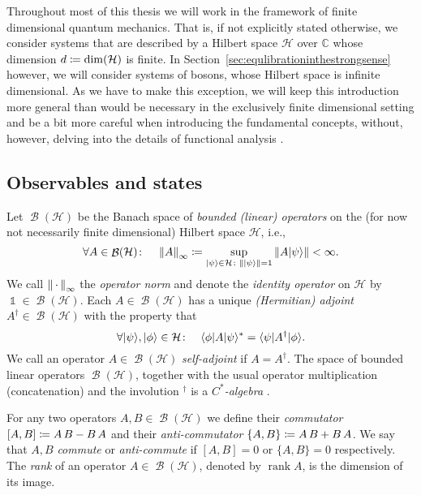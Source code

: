 \documentclass[a4paper,12pt,listof=totoc,index=totoc,bibliography=totoc,headsepline=false,headings=normal,BCOR16.153846mm,DIV12,headinclude,twoside,cleardoublepage=empty,numbers=noenddot,final]{scrreprt}
\theoremstyle{mystyle}
\numberwithin{equation}{section}
\numberwithin{figure}{section}
\numberwithin{lemma}{section}
\numberwithin{theorem}{section}
\numberwithin{corollary}{section}
\numberwithin{definition}{section}
\numberwithin{conjecture}{section}
\numberwithin{observation}{section}
\newcommand{\+}{\mkern2mu}
\newcommand{\coloneqq}{\mathrel{\vcentcolon\mkern-1.2mu=}} %
\newcommand{\argdot}{{\,\cdot\,}}
\newcommand{\suchthat}{\colon}
\newcommand{\itholds}{\colon\mathchoice{\quad}{}{}{}}
\newcommand{\bra}[1]{\langle #1|}
\newcommand{\ket}[1]{|#1\rangle}
\newcommand{\norm}[2][]{
  \ifthenelse{\equal{#1}{}}
    {\left\| {#2} \right\|}
    {\ifthenelse{\equal{#1}{uinv}}
      {\left\vert\kern-0.25ex\left\vert\kern-0.25ex\left\vert {#2} \right\vert\kern-0.25ex\right\vert\kern-0.25ex\right\vert}
      {\left\| {#2} \right\|_{#1}}
    }
}
\newcommand{\ad}{^\dagger}
\DeclareMathOperator{\1}{\mathds{1}}
\DeclareMathOperator{\Bop}{\mathcal{B}}
\DeclareMathOperator{\rank}{rank}
\newcommand{\mc}[1]{\mathcal{#1}}
\newcommand{\mcH}{\mc{H}}
\newcommand{\mb}[1]{\mathbb{#1}}
\renewcommand{\C}{\mb{C}} %
\begin{document}
Throughout most of this thesis we will work in the framework of finite dimensional quantum mechanics.
That is, if not explicitly stated otherwise, we consider systems that are described by a Hilbert space $\mcH$ over $\C$ whose dimension $d\coloneqq\dim(\mcH)$ is finite.
In Section~\ref{sec:equlibrationinthestrongsense} however, we will consider systems of bosons, whose Hilbert space is infinite dimensional.
As we have to make this exception, we will keep this introduction more general than would be necessary in the exclusively finite dimensional setting and be a bit more careful when introducing the fundamental concepts, without, however, delving into the details of functional analysis \cite{Reed1980,Reed1975,BratteliRobinson1,BratteliRobinson2}.


\subsection{Observables and states}
\label{sec:observablesandstates}
%
Let $\Bop(\mcH)$ be the Banach space of \emph{bounded (linear) operators} on the (for now not necessarily finite dimensional) Hilbert space $\mcH$, i.e.,
\begin{equation} \label{eq:operatornorm}
  \forall A \in \Bop(\mcH) \itholds \norm[\infty]A \coloneqq \sup_{\ket\psi\in\mcH\suchthat\norm{\ket\psi}=1} \norm{A \ket\psi} < \infty.
\end{equation}
We call $\norm[\infty]\argdot$ the \emph{operator norm} and denote the \emph{identity operator} on $\mcH$ by $\1 \in \Bop(\mcH)$.
Each $A \in \Bop(\mcH)$ has a unique \emph{(Hermitian) adjoint} $A\ad \in \Bop(\mcH)$ with the property that
\begin{equation} \label{eq:defadjoint}
  \forall \ket\psi,\ket\phi\in\mcH\itholds \bra\phi A \ket\psi^* = \bra\psi A\ad \ket\phi.
\end{equation}
We call an operator $A\in \Bop(\mcH)$ \emph{self-adjoint} if $A = A\ad$.
The space of bounded linear operators $\Bop(\mcH)$, together with the usual operator multiplication (concatenation) and the involution $\ad$ is a \emph{$C^*$-algebra} \cite{Arveson76}.

For any two operators $A,B \in \Bop(\mcH)$ we define their \emph{commutator} $[A,B] \coloneqq A\,B - B\,A$ and their \emph{anti-commutator} $\{A,B\} \coloneqq A\,B + B\,A$.
We say that $A,B$ \emph{commute} or \emph{anti-commute} if $[A,B] = 0$ or $\{A,B\}=0$ respectively.
The \emph{rank} of an operator $A \in \Bop(\mcH)$, denoted by $\rank A$, is the dimension of its image.
\end{document}
